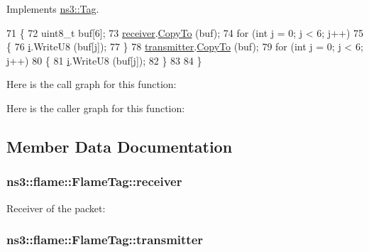 Implements \hyperlink{classns3_1_1Tag_ac9aa7c4f923da5d2c82de94690101dc3}{ns3\+::\+Tag}.


\begin{DoxyCode}
71 \{
72   uint8\_t buf[6];
73   \hyperlink{classns3_1_1flame_1_1FlameTag_a7f0f7e6470b5b8f008fc6a2e10543f89}{receiver}.\hyperlink{classns3_1_1Mac48Address_af18ec8c52c35fccc664802747ae9a0b6}{CopyTo} (buf);
74   \textcolor{keywordflow}{for} (\textcolor{keywordtype}{int} j = 0; j < 6; j++)
75     \{
76       \hyperlink{bernuolliDistribution_8m_a6f6ccfcf58b31cb6412107d9d5281426}{i}.WriteU8 (buf[j]);
77     \}
78   \hyperlink{classns3_1_1flame_1_1FlameTag_ab4db4fee20ce88de31a8bdd63f7384ac}{transmitter}.\hyperlink{classns3_1_1Mac48Address_af18ec8c52c35fccc664802747ae9a0b6}{CopyTo} (buf);
79   \textcolor{keywordflow}{for} (\textcolor{keywordtype}{int} j = 0; j < 6; j++)
80     \{
81       \hyperlink{bernuolliDistribution_8m_a6f6ccfcf58b31cb6412107d9d5281426}{i}.WriteU8 (buf[j]);
82     \}
83 
84 \}
\end{DoxyCode}


Here is the call graph for this function\+:




Here is the caller graph for this function\+:




\subsection{Member Data Documentation}
\subsubsection[{\texorpdfstring{receiver}{receiver}}]{ ns3\+::flame\+::\+Flame\+Tag\+::receiver}\hypertarget{classns3_1_1flame_1_1FlameTag_a7f0f7e6470b5b8f008fc6a2e10543f89}{}\label{classns3_1_1flame_1_1FlameTag_a7f0f7e6470b5b8f008fc6a2e10543f89}


Receiver of the packet\+: 

\subsubsection[{\texorpdfstring{transmitter}{transmitter}}]{ ns3\+::flame\+::\+Flame\+Tag\+::transmitter}\hypertarget{classns3_1_1flame_1_1FlameTag_ab4db4fee20ce88de31a8bdd63f7384ac}{}\label{classns3_1_1flame_1_1FlameTag_ab4db4fee20ce88de31a8bdd63f7384ac}


